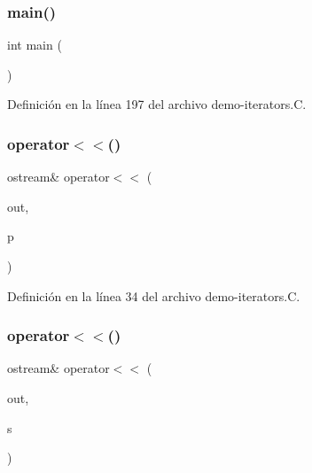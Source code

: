 \subsubsection{\texorpdfstring{main()}{main()}}
{\footnotesize\ttfamily int main (\begin{DoxyParamCaption}{ }\end{DoxyParamCaption})}



Definición en la línea 197 del archivo demo-\/iterators.\+C.

\mbox{\label{demo-iterators_8_c_a923e96e2eb2a21cf7d668e804417c47a}} 
\subsubsection{\texorpdfstring{operator$<$$<$()}{operator<<()}\hspace{0.1cm}{\footnotesize\ttfamily [1/2]}}
{\footnotesize\ttfamily ostream\& operator$<$$<$ (\begin{DoxyParamCaption}\item[{ostream \&}]{out,  }\item[{const Polygon\+::\+Point\+Type \&}]{p }\end{DoxyParamCaption})}



Definición en la línea 34 del archivo demo-\/iterators.\+C.

\mbox{\label{demo-iterators_8_c_aeeb3d06d99a03eacdce5a549712941cb}} 
\subsubsection{\texorpdfstring{operator$<$$<$()}{operator<<()}\hspace{0.1cm}{\footnotesize\ttfamily [2/2]}}
{\footnotesize\ttfamily ostream\& operator$<$$<$ (\begin{DoxyParamCaption}\item[{ostream \&}]{out,  }\item[{const Polygon\+::\+Segment\+Type \&}]{s }\end{DoxyParamCaption})}



